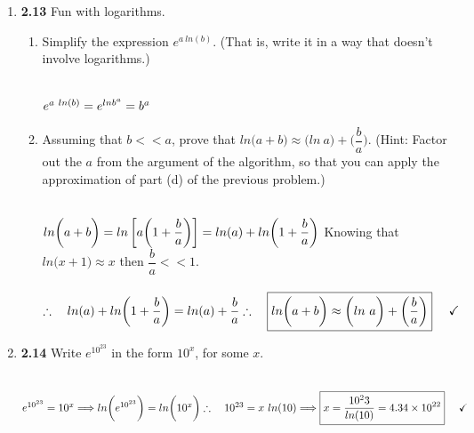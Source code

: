\documentclass[fleqn]{article}
\begin{document}
\begin{enumerate}
    \item \textbf{2.13}  Fun with logarithms.
    \begin{enumerate}
      \item Simplify the expression $e^{a ~ ln(b)}$. (That is, write it in a way that doesn't involve logarithms.)

        \textcolor{hwColor}{
          \\
          $
            e^{a ~ ln(b)}=e^{ln b^a}=b^a
            \\
          $
        }

      \item Assuming that $b << a$, prove that $ln \bigg( a+b \bigg) \approx \bigg( ln ~ a\bigg)+\bigg( \dfrac{b}{a}\bigg)$.
      (Hint: Factor out the $a$ from the argument of the algorithm, so that you can apply the approximation of part (d)
      of the previous problem.)

        \textcolor{hwColor}{
          \\
          $
            ln \bigg( a+b \bigg)=ln \left[a\bigg( 1+\dfrac{b}{a} \bigg)\right]=ln(a)+ln \bigg( 1+\dfrac{b}{a} \bigg)
            \\
            \\
          $
          Knowing that $ln \bigg( x+1 \bigg) \approx x$ then $\dfrac{b}{a} << 1$.
          \\
          \\
          $
            \therefore ~~~ ln(a)+ln \bigg( 1+\dfrac{b}{a} \bigg)=ln(a)+\dfrac{b}{a}
            \\
            \\
            \\
            \therefore ~~~ \boxed{
              ln \bigg( a+b \bigg) \approx \bigg( ln ~ a\bigg)+\bigg( \dfrac{b}{a}\bigg)
            } ~~~~ \checkmark
            \\
          $
        }

    \end{enumerate}

    \item \textbf{2.14} Write $e^{10^{23}}$ in the form  $10^x$, for some $x$.

      \textcolor{hwColor}{
        \\
        $
          e^{10^{23}}=10^x \Longrightarrow ln\bigg( e^{10^{23}} \bigg)=ln\bigg( 10^x \bigg)
          \\
          \\
          \therefore ~~~ 10^{23}=x ~ ln(10)
          \Longrightarrow \boxed{
            x=\dfrac{10^23}{ln(10)}=4.34 \times 10^{22}
          } ~~~~ \checkmark
        $
      }


\end{enumerate}
\end{document}
